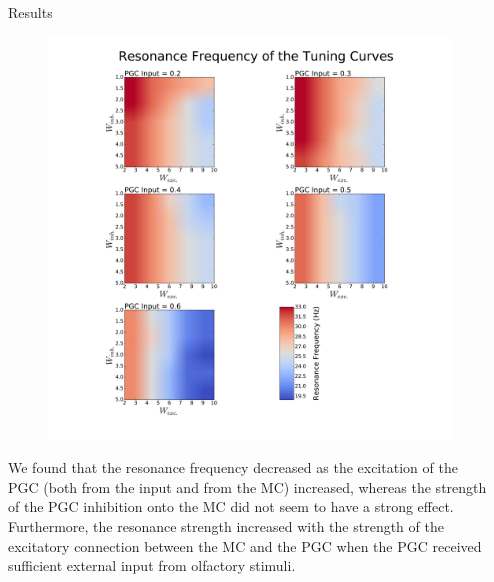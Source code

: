 \documentclass[final,hyperref={pdfpagelabels=false}]{beamer}
\begin{document}
\begin{frame}{}
\begin{columns}[t]
\begin{column}{.48\linewidth}
\end{column}
\begin{column}{.48\linewidth}

\begin{block}{Results}
\begin{figure}
\center
\includegraphics[scale=0.5]{images/Contour_plot_tuning_frequency}
\end{figure} 
We found that the resonance frequency decreased as the excitation of the PGC (both from the input and from the MC) increased, whereas the strength of the PGC inhibition onto the MC did not seem to have a strong effect. 
Furthermore, the resonance strength increased with the strength of the excitatory connection between the MC and the PGC when the PGC received sufficient external input from olfactory stimuli.
\end{block}


\end{column}
\end{columns}
\end{frame}
\end{document}
